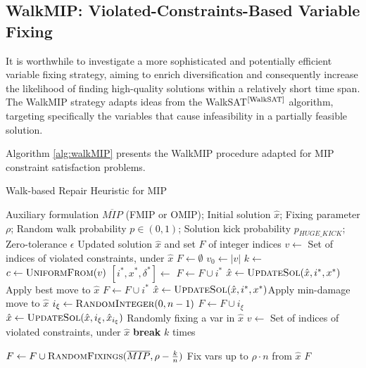 \subsection{WalkMIP: Violated-Constraints-Based Variable Fixing}

It is worthwhile to investigate a more sophisticated and potentially efficient variable fixing strategy, aiming to enrich diversification and consequently increase the likelihood of finding high-quality solutions within a relatively short time span. The WalkMIP strategy adapts ideas from the WalkSAT$^\text{\cite{WalkSAT}}$ algorithm, targeting specifically the variables that cause infeasibility in a partially feasible solution. 

Algorithm \ref{alg:walkMIP} presents the WalkMIP procedure adapted for MIP constraint satisfaction problems.

\begin{algorithm}[htbp]
\caption{Walk-based Repair Heuristic for MIP}\label{alg:walkMIP}
\begin{algorithmic}[1]
\Require Auxiliary formulation $\overline{MIP}$ (FMIP or OMIP); Initial solution $\hat{x}$; Fixing parameter $\rho$; Random walk probability $p \in (0,1)$; Solution kick probability $p_{HUGE\_KICK}$; Zero-tolerance $\epsilon$
\Ensure Updated solution $\hat{x}$ and set $F$ of integer indices
    \State $v \gets$ Set of indices of violated constraints, under $\hat{x}$
    \State $F \gets \emptyset$
     $v_0 \gets |v|$\EndIf
     \Return \EndIf
        \State \Return {}
    \EndIf
    \State $k \gets $
    \Repeat
        \State $c \gets \Call{UniformFrom}{v}$
        \State $[i^*, x^*, \delta^*] \gets$ 
        \If{$\delta^* \leq -\epsilon$}
            \State $F \gets F \cup i^*$
            \State $\hat{x} \gets \Call{UpdateSol}{\hat{x},i^*,x^*}$\Comment Apply best move to $\hat{x}$
            \State $F \gets F \cup i^*$
            \State $\hat{x} \gets \Call{UpdateSol}{\hat{x},i^*,x^*}$\Comment Apply min-damage move to $\hat{x}$
        \Else 
            \State $i_{\xi} \gets \Call{RandomInteger}{0,n-1}$
            \State $F \gets F \cup i_{\xi}$
            \State $\hat{x} \gets \Call{UpdateSol}{\hat{x}, i_{\xi},\hat{x}_{i_{\xi}}}$ \Comment Randomly fixing a var in $\hat{x}$
        \EndIf
        \State $v \gets$ Set of indices of violated constraints, under $\hat{x}$
         \textbf{break} \EndIf
    \Until $k$ times

        \State $F \gets  F\cup \Call{RandomFixings}{\overline{MIP},\rho- {k\over{n}}}$ \Comment Fix vars up to $\rho \cdot n$ from $\hat{x}$
    \EndIf
    \State \Return $F$
\EndFunction
\end{algorithmic}
\end{algorithm}

